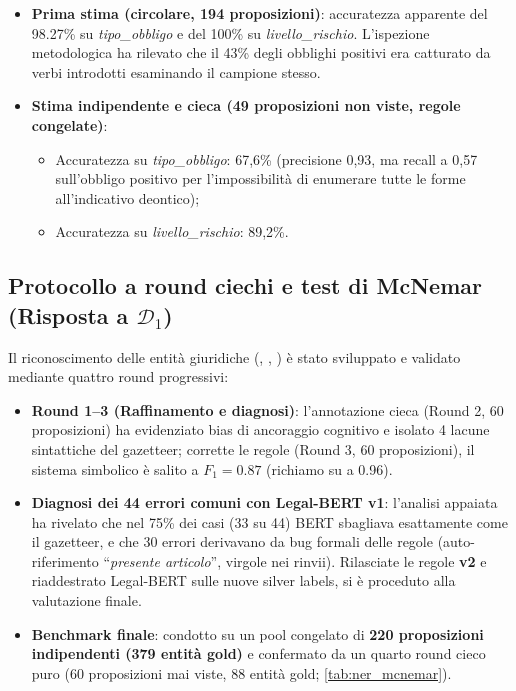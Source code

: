 \documentclass[12pt,a4paper,oneside]{report}
\DeclareRobustCommand{\campo}[1]{\texttt{\detokenize{#1}}}
\begin{document}
\begin{itemize}
    \item \textbf{Prima stima (circolare, 194 proposizioni)}: accuratezza apparente del \num{98,27}\% su \textit{tipo\_obbligo} e del \num{100}\% su \textit{livello\_rischio}. L'ispezione metodologica ha rilevato che il 43\% degli obblighi positivi era catturato da verbi introdotti esaminando il campione stesso.
    \item \textbf{Stima indipendente e cieca (49 proposizioni non viste, regole congelate)}:
    \begin{itemize}
        \item Accuratezza su \textit{tipo\_obbligo}: 67,6\% (precisione 0,93, ma recall a 0,57 sull'obbligo positivo per l'impossibilità di enumerare tutte le forme all'indicativo deontico);
        \item Accuratezza su \textit{livello\_rischio}: 89,2\%.
    \end{itemize}
\end{itemize}

\subsection{Protocollo a round ciechi e test di McNemar (Risposta a \texorpdfstring{$\mathcal{D}_1$}{D1})}
Il riconoscimento delle entità giuridiche (\campo{ATTORE}, \campo{AUTORITA}, \campo{RIF_NORMATIVO}) è stato sviluppato e validato mediante quattro round progressivi:
\begin{itemize}
  \item \textbf{Round 1--3 (Raffinamento e diagnosi)}: l'annotazione cieca (Round 2, 60 proposizioni) ha evidenziato bias di ancoraggio cognitivo e isolato 4 lacune sintattiche del gazetteer; corrette le regole (Round 3, 60 proposizioni), il sistema simbolico è salito a $F_1 = \num{0,87}$ (richiamo su \campo{ATTORE} a \num{0,96}).
  \item \textbf{Diagnosi dei 44 errori comuni con Legal-BERT v1}: l'analisi appaiata ha rivelato che nel 75\% dei casi (33 su 44) BERT sbagliava esattamente come il gazetteer, e che 30 errori derivavano da bug formali delle regole (auto-riferimento \enquote{\emph{presente articolo}}, virgole nei rinvii). Rilasciate le regole \textbf{v2} e riaddestrato Legal-BERT sulle nuove silver labels, si è proceduto alla valutazione finale.
  \item \textbf{Benchmark finale}: condotto su un pool congelato di \textbf{220 proposizioni indipendenti (379 entità gold)} e confermato da un quarto round cieco puro (60 proposizioni mai viste, 88 entità gold; \cref{tab:ner_mcnemar}).
\end{itemize}
\end{document}

